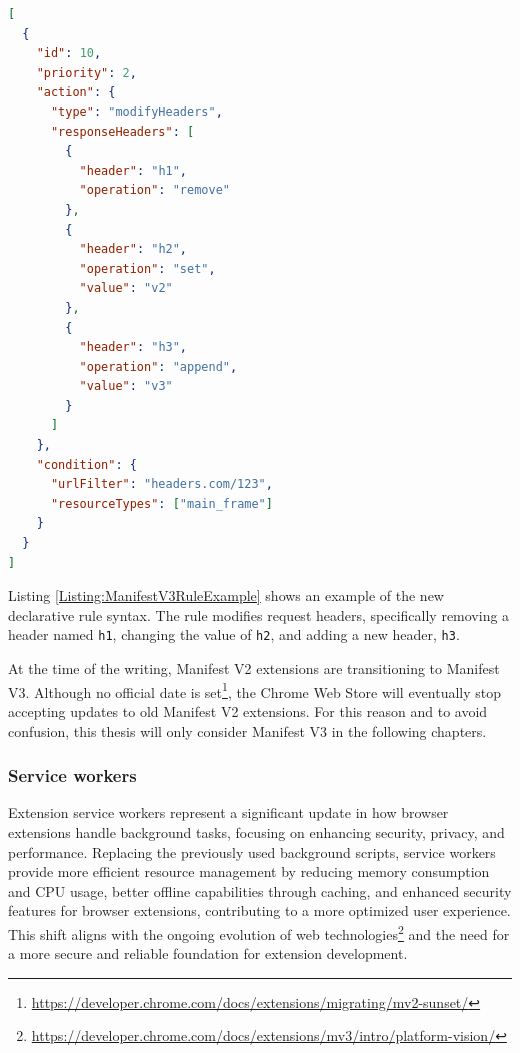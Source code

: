 \bigbreak

\begin{lstlisting}[language={JSON},caption={An example of a declarative rule which modifies selected response headers \cite{ChromeWebExtensions}.}, label={Listing:ManifestV3RuleExample}]
[
  {
    "id": 10,
    "priority": 2,
    "action": {
      "type": "modifyHeaders",
      "responseHeaders": [
        {
          "header": "h1",
          "operation": "remove"
        },
        {
          "header": "h2",
          "operation": "set",
          "value": "v2"
        },
        {
          "header": "h3",
          "operation": "append",
          "value": "v3"
        }
      ]
    },
    "condition": {
      "urlFilter": "headers.com/123",
      "resourceTypes": ["main_frame"]
    }
  }
]
\end{lstlisting}

\medbreak

Listing \ref{Listing:ManifestV3RuleExample} shows an example of the new declarative rule syntax. The rule modifies request headers, specifically removing a header named \texttt{h1}, changing the value of \texttt{h2}, and adding a new header, \texttt{h3}.

At the time of the writing, Manifest V2 extensions are transitioning to Manifest V3. Although no official date is set\footnote{\url{https://developer.chrome.com/docs/extensions/migrating/mv2-sunset/}}, the Chrome Web Store will eventually stop accepting updates to old Manifest V2 extensions. For this reason and to avoid confusion, this thesis will only consider Manifest V3 in the following chapters.

\subsubsection{Service workers}

Extension service workers represent a significant update in how browser extensions handle background tasks, focusing on enhancing security, privacy, and performance. Replacing the previously used background scripts, service workers provide more efficient resource management by reducing memory consumption and CPU usage, better offline capabilities through caching, and enhanced security features for browser extensions, contributing to a more optimized user experience. This shift aligns with the ongoing evolution of web technologies\footnote{{\url{https://developer.chrome.com/docs/extensions/mv3/intro/platform-vision/}}} and the need for a more secure and reliable foundation for extension development.

